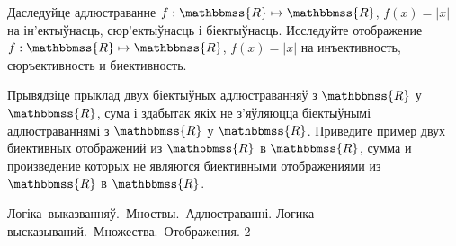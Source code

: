 \begin{problemList}
\problemItemSimple
{Даследуйце адлюстраванне $f: \mathbbmss{R} \mapsto \mathbbmss{R}$, $f(x) = |x|$ на ін'ектыўнасць, сюр'ектыўнасць і біектыўнасць. }
{Исследуйте отображение $f: \mathbbmss{R} \mapsto \mathbbmss{R}$, $f(x) = |x|$ на инъективность, сюръективность и биективность.}

\bigskip

\problemItemSimple
{Прывядзіце прыклад двух біектыўных адлюстраванняў з $\mathbbmss{R}$ у $\mathbbmss{R}$, сума і здабытак якіх не з'яўляюцца біектыўнымі адлюстраваннямі з $\mathbbmss{R}$ у $\mathbbmss{R}$.}
{Приведите пример двух биективных отображений из $\mathbbmss{R}$ в $\mathbbmss{R}$, сумма и произведение которых не являются биективными отображениями из $\mathbbmss{R}$ в $\mathbbmss{R}$.}

\end{problemList}

\newpage

\quizTitle
{Логіка~выказванняў.~Мноствы.~Адлюстраванні.}
{Логика высказываний.~Множества.~Отображения.}
{2}

